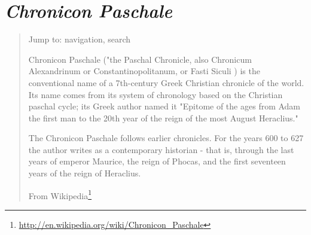 \documentclass[12pt,letterpaper,twoside,final]{memoir}
\begin{document}
\section{\emph{Chronicon Paschale}}
\blockquote[From Wikipedia\footnote{\url{http://en.wikipedia.org/wiki/Chronicon_Paschale}}]{
Jump to: navigation, search

Chronicon Paschale ("the Paschal Chronicle, also Chronicum Alexandrinum or Constantinopolitanum, or Fasti Siculi ) is the conventional name of a 7th-century Greek Christian chronicle of the world. Its name comes from its system of chronology based on the Christian paschal cycle; its Greek author named it "Epitome of the ages from Adam the first man to the 20th year of the reign of the most August Heraclius."

The Chronicon Paschale follows earlier chronicles. For the years 600 to 627 the author writes as a contemporary historian - that is, through the last years of emperor Maurice, the reign of Phocas, and the first seventeen years of the reign of Heraclius.}
\end{document}
